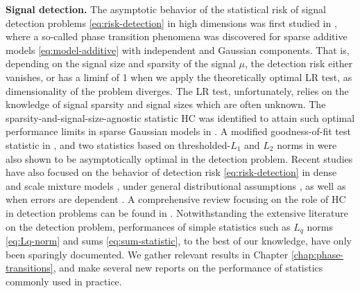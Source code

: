 

{\bf Signal detection.}
The asymptotic behavior of the statistical risk of signal detection problems \eqref{eq:risk-detection} in high dimensions was first studied in \cite{ingster1998minimax}, where a so-called phase transition phenomena was discovered for sparse additive models \eqref{eq:model-additive} with independent and Gaussian components. 
That is, depending on the signal size and sparsity of the signal $\mu$, the detection risk either vanishes, or has a liminf of 1 when we apply the theoretically optimal \ac{LR} test, as dimensionality of the problem diverges.
The \ac{LR} test, unfortunately, relies on the knowledge of signal sparsity and signal sizes which are often unknown.
The sparsity-and-signal-size-agnostic statistic \ac{HC} was identified to attain such optimal performance limits in sparse Gaussian models in \cite{donoho2004higher}. 
A modified goodness-of-fit test statistic in \citet{zhang2002powerful}, and two statistics based on thresholded-$L_1$ and $L_2$ norms in \cite{zhong2013tests} were also shown to be asymptotically optimal in the detection problem.
Recent studies have also focused on the behavior of detection risk \eqref{eq:risk-detection} in dense and scale mixture models \cite{cai2011optimal}, under general distributional assumptions \citep{cai2014optimal, arias2017distribution1}, as well as when errors are dependent \citep{hall2010innovated}.
A comprehensive review focusing on the role of \ac{HC} in detection problems can be found in \cite{donoho2015special}.
Notwithstanding the extensive literature on the detection problem, performances of simple statistics such as $L_q$ norms \eqref{eq:Lq-norm} and sums \eqref{eq:sum-statistic}, to the best of our knowledge, have only been sparingly documented. 
We gather relevant results in Chapter \ref{chap:phase-transitions}, and make several new reports on the performance of statistics commonly used in practice.

